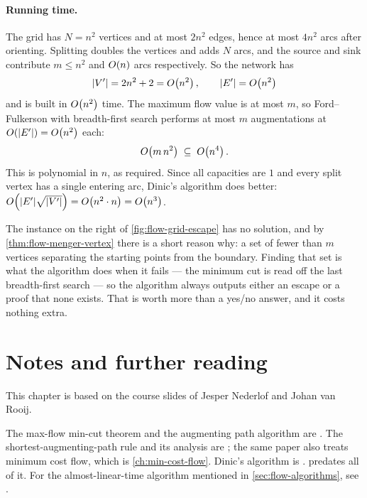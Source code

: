\paragraph{Running time.}
The grid has $N = n^2$ vertices and at most $2n^2$ edges, hence at most $4n^2$
arcs after orienting. Splitting doubles the vertices and adds $N$ arcs, and the
source and sink contribute $m \le n^2$ and $O\!\left(n\right)$ arcs respectively. So
the network has
\[ |V'| = 2n^2 + 2 = O\!\left(n^2\right), \qquad |E'| = O\!\left(n^2\right) \]
and is built in $O\!\left(n^2\right)$ time. The maximum flow value is at most $m$, so
Ford--Fulkerson with breadth-first search performs at most $m$ augmentations at
$O\!\left(|E'|\right) = O\!\left(n^2\right)$ each:
\[ O\!\left(m \, n^2\right) \;\subseteq\; O\!\left(n^4\right). \]
This is polynomial in $n$, as required. Since all capacities are $1$ and every
split vertex has a single entering arc, Dinic's algorithm does better:
$O\!\left(|E'|\sqrt{|V'|}\right) = O\!\left(n^2 \cdot n\right) = O\!\left(n^3\right)$.

\begin{intuition}
The instance on the right of \cref{fig:flow-grid-escape} has no solution, and
by \cref{thm:flow-menger-vertex} there is a short reason why: a set of fewer
than $m$ vertices separating the starting points from the boundary. Finding
that set is what the algorithm does when it fails --- the minimum cut is read
off the last breadth-first search --- so the algorithm always outputs either an
escape or a proof that none exists. That is worth more than a yes/no answer,
and it costs nothing extra.
\end{intuition}

\section{Notes and further reading}
\label{sec:flow-further-reading}

This chapter is based on the course slides of Jesper Nederlof and Johan van
Rooij.

The max-flow min-cut theorem and the augmenting path algorithm are
\citet{FordFulkerson1956}. The shortest-augmenting-path rule and its analysis
are \citet{EdmondsKarp1972}; the same paper also treats minimum cost flow,
which is \cref{ch:min-cost-flow}. Dinic's algorithm is \citet{Dinitz1970}.
\citet{Menger1927} predates all of it. For the almost-linear-time algorithm
mentioned in \cref{sec:flow-algorithms}, see
\citet{ChenKyngLiuPengProbstGutenbergSachdeva2022}.

